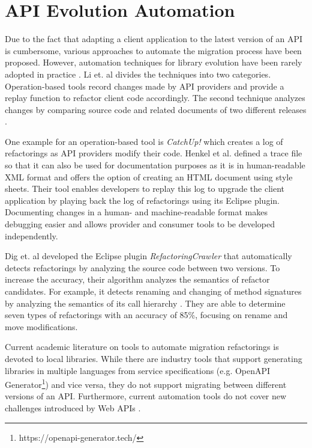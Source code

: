 \section{API Evolution Automation}
\label{sec:APIEvolutionAutomation}

Due to the fact that adapting a client application to the latest version of an API is cumbersome, various approaches to automate the migration process have been proposed. However, automation techniques for library evolution have been rarely adopted in practice \cite[p. 300]{li_how_2013}. Li et. al divides the techniques into two categories. Operation-based tools record changes made by API providers and provide a replay function to refactor client code accordingly. The second technique analyzes changes by comparing source code and related documents of two different releases \cite[p. 306]{li_how_2013}. 

One example for an operation-based tool is \textit{CatchUp!} \cite{henkel_catchup!_2005} which creates a log of refactorings as API providers modify their code. Henkel et al. defined a trace file so that it can also be used for documentation purposes as it is in human-readable XML format and offers the option of creating an HTML document using style sheets. Their tool enables developers to replay this log to upgrade the client application by playing back the log of refactorings using its Eclipse plugin. Documenting changes in a human- and machine-readable format makes debugging easier and allows provider and consumer tools to be developed independently.

Dig et. al \cite{hutchison_automated_2006} developed the Eclipse plugin \textit{RefactoringCrawler} that automatically
detects refactorings by analyzing the source code between two versions. To increase the accuracy, their algorithm analyzes the semantics of refactor candidates. For example, it detects renaming and changing of method signatures by analyzing the semantics of its call hierarchy \cite{hutchison_automated_2006}. They are able to determine seven types of refactorings with an accuracy of 85\%, focusing on rename and move modifications. 

Current academic literature on tools to automate migration refactorings is devoted to local libraries. While there are industry tools that support generating libraries in multiple languages from service specifications (e.g. OpenAPI Generator\footnote{https://openapi-generator.tech/}) and vice versa, they do not support migrating between different versions of an API. Furthermore, current automation tools do not cover new challenges introduced by Web APIs \cite[p. 306]{li_how_2013}.